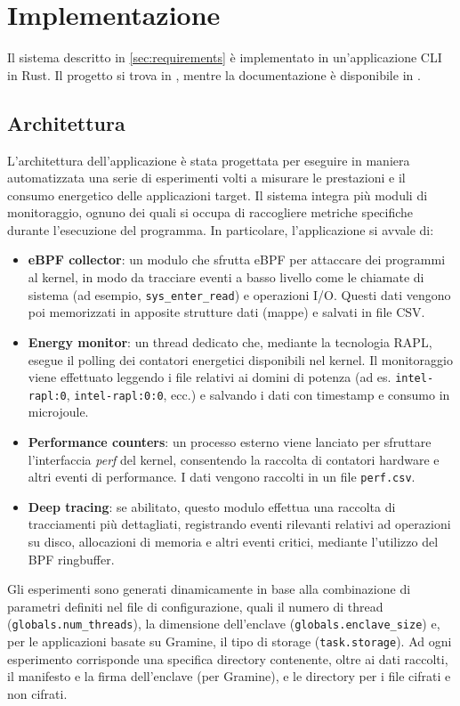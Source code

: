 \documentclass{article}
\begin{document}
\clearpage
\section{Implementazione}
Il sistema descritto in \cref{sec:requirements} è implementato in un'applicazione CLI in Rust. Il progetto si trova in \cite{eb-repo} , mentre la documentazione è disponibile in \cite{eb-docs}.
\subsection{Architettura}
L'architettura dell'applicazione è stata progettata per eseguire in maniera automatizzata una serie di esperimenti volti a misurare le prestazioni e il consumo energetico delle applicazioni target. Il sistema integra più moduli di monitoraggio, ognuno dei quali si occupa di raccogliere metriche specifiche durante l'esecuzione del programma. In particolare, l'applicazione si avvale di:
\begin{itemize}
  \item \textbf{eBPF collector}: un modulo che sfrutta eBPF per attaccare dei programmi al kernel, in modo da tracciare eventi a basso livello come le chiamate di sistema (ad esempio, \texttt{sys\_enter\_read}) e operazioni I/O. Questi dati vengono poi memorizzati in apposite strutture dati (mappe) e salvati in file CSV.
  \item \textbf{Energy monitor}: un thread dedicato che, mediante la tecnologia RAPL, esegue il polling dei contatori energetici disponibili nel kernel. Il monitoraggio viene effettuato leggendo i file relativi ai domini di potenza (ad es. \texttt{intel-rapl:0}, \texttt{intel-rapl:0:0}, ecc.) e salvando i dati con timestamp e consumo in microjoule.
  \item \textbf{Performance counters}: un processo esterno viene lanciato per sfruttare l'interfaccia \textit{perf} del kernel, consentendo la raccolta di contatori hardware e altri eventi di performance. I dati vengono raccolti in un file \texttt{perf.csv}.
  \item \textbf{Deep tracing}: se abilitato, questo modulo effettua una raccolta di tracciamenti più dettagliati, registrando eventi rilevanti relativi ad operazioni su disco, allocazioni di memoria e altri eventi critici, mediante l'utilizzo del BPF ringbuffer.
\end{itemize}

Gli esperimenti sono generati dinamicamente in base alla combinazione di parametri definiti nel file di configurazione, quali il numero di thread (\texttt{globals.num\_threads}), la dimensione dell'enclave (\texttt{globals.enclave\_size}) e, per le applicazioni basate su Gramine, il tipo di storage (\texttt{task.storage}). Ad ogni esperimento corrisponde una specifica directory contenente, oltre ai dati raccolti, il manifesto e la firma dell'enclave (per Gramine), e le directory per i file cifrati e non cifrati.
\end{document}
